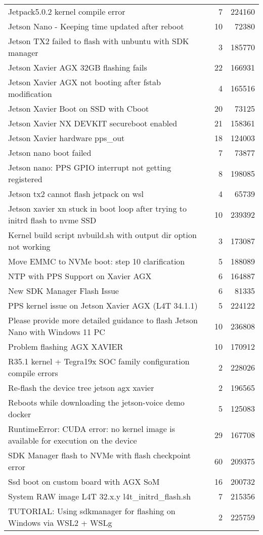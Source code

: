 \begin{longtable}{p{}rr}
Jetpack5.0.2 kernel compile error&7&224160\\
Jetson Nano - Keeping time updated after reboot&10&72380\\
Jetson TX2 failed to flash with unbuntu with SDK manager&3&185770\\
Jetson Xavier AGX 32GB flashing fails&22&166931\\
Jetson Xavier AGX not booting after fstab modification&4&165516\\
Jetson Xavier Boot on SSD with Cboot&20&73125\\
Jetson Xavier NX DEVKIT secureboot enabled&21&158361\\
Jetson Xavier hardware pps\_out&18&124003\\
Jetson nano boot failed&7&73877\\
Jetson nano: PPS GPIO interrupt not getting registered&8&198085\\
Jetson tx2 cannot flash jetpack on wsl&4&65739\\
Jetson xavier xn stuck in boot loop after trying to initrd flash to nvme SSD&10&239392\\
Kernel build script nvbuild.sh with output dir option not working&3&173087\\
Move EMMC to NVMe boot: step 10 clarification&5&188089\\
NTP with PPS Support on Xavier AGX&6&164887\\
New SDK Manager Flash Issue&6&81335\\
PPS kernel issue on Jetson Xavier AGX (L4T 34.1.1)&5&224122\\
Please provide more detailed guidance to flash Jetson Nano with Windows 11 PC&10&236808\\
Problem flashing AGX XAVIER&10&170912\\
R35.1 kernel + Tegra19x SOC family configuration compile errors&2&228026\\
Re-flash the device tree jetson agx xavier&2&196565\\
Reboots while downloading the jetson-voice demo docker&5&125083\\
RuntimeError: CUDA error: no kernel image is available for execution on the device&29&167708\\
SDK Manager flash to NVMe with flash checkpoint error&60&209375\\
Ssd boot on custom board with AGX SoM&16&200732\\
System RAW image L4T 32.x.y l4t\_initrd\_flash.sh&7&215356\\
TUTORIAL: Using sdkmanager for flashing on Windows via WSL2 + WSLg&2&225759\\

\end{longtable}
